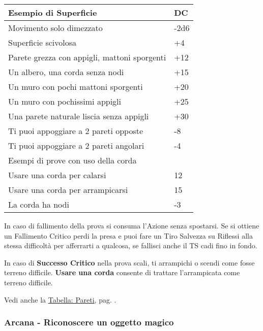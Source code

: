 \begin{multicols}{2}
\noindent\begin{tabularx}{\linewidth}{Xl}
	\toprule
 \rowcolor{gray!20}\textbf{Esempio di Superficie} & \textbf{DC}\\
	\toprule
	Movimento solo dimezzato & -2d6\\
 \rowcolor{gray!20}Superficie scivolosa&+4\\
	{\small Parete grezza con appigli, mattoni sporgenti}&+12\\
 \rowcolor{gray!20}Un albero, una corda senza nodi&+15\\
	Un muro con pochi mattoni sporgenti &+20\\
 \rowcolor{gray!20}Un muro con pochissimi appigli&+25\\
	Una parete naturale liscia senza appigli&+30\\
 \rowcolor{gray!20}Ti puoi appoggiare a 2 pareti opposte&-8\\
	Ti puoi appoggiare a 2 pareti angolari&-4\\
	\midrule
 \rowcolor{gray!20}Esempi di prove con uso della corda&\\
	\midrule
	Usare una corda per calarsi&12\\
 \rowcolor{gray!20}Usare una corda per arrampicarsi&15\\
	La corda ha nodi & -3
\end{tabularx}

\medskip

In caso di fallimento della prova si consuma l'Azione senza spostarsi. Se si ottiene un Fallimento Critico perdi la presa e puoi fare un Tiro Salvezza su Riflessi alla stessa difficoltà per afferrarti a qualcosa, se fallisci anche il TS cadi fino in fondo.

In caso di \textbf{Successo Critico} nella prova scali, ti arrampichi o scendi come fosse terreno difficile. \textbf{Usare una corda} consente di trattare l'arrampicata come terreno difficile.

Vedi anche la \hyperlink{pareti}{Tabella: Pareti}, pag. \pageref{pareti}.

\titlespacing*{\subsubsection}{0pt}{0.5em}{0.5em}\subsubsection*{Arcana - Riconoscere un oggetto magico} \label{rinoscereoggettomagico}\hypertarget{rinoscereoggettomagico}{}


\end{multicols}
